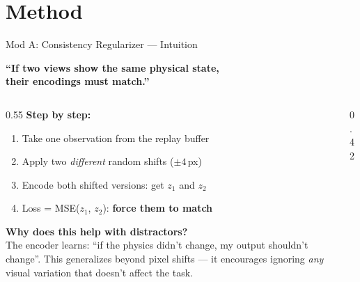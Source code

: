 \documentclass[aspectratio=169]{beamer}
\newcommand{\highlight}[1]{\textcolor{AccentOrange}{\textbf{#1}}}
\begin{document}
\section{Method}

\begin{frame}{Mod A: Consistency Regularizer --- Intuition}

\begin{center}
\large\color{UofTBlue}
\textbf{``If two views show the same physical state,\\their encodings must match.''}
\end{center}

\vspace{0.3em}
\small
\begin{columns}[T]
\begin{column}{0.55\textwidth}
\textbf{Step by step:}
\begin{enumerate}\setlength{\itemsep}{3pt}
    \item Take one observation from the replay buffer
    \item Apply two \emph{different} random shifts ($\pm 4$\,px)
    \item Encode both shifted versions: get $z_1$ and $z_2$
    \item Loss = MSE($z_1$, $z_2$): \highlight{force them to match}
\end{enumerate}

\vspace{0.3em}
\textbf{Why does this help with distractors?}\\
The encoder learns: ``if the physics didn't change, my output shouldn't change''. This generalizes beyond pixel shifts --- it encourages ignoring \emph{any} visual variation that doesn't affect the task.
\end{column}
\begin{column}{0.42\textwidth}
\centering
{}
\end{column}
\end{columns}
\end{frame}
\end{document}
